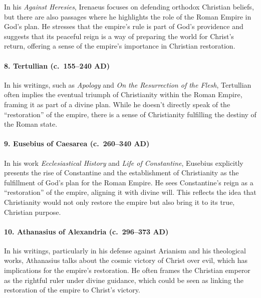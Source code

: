 In his \emph{Against Heresies}, Irenaeus focuses on defending orthodox Christian beliefs, but there are also passages where he highlights the role of the Roman Empire in God's plan.
He stresses that the empire's rule is part of God's providence and suggests that its peaceful reign is a way of preparing the world for Christ's return, offering a sense of the empire's importance in Christian restoration.

\paragraph{8.
Tertullian (c.~155--240 AD)}\label{par:tertullian-c.-155240-ad---in-his-writings-such-as-apology-and-on-the-resurrection-of-the-flesh-tertullian-often-implies-the-eventual-triumph-of-christianity-within-the-roman-empire-framing-it-as-part-of-a-divine-plan.-while-he-doesnt-directly-speak-of-the-restoration-of-the-empire-there-is-a-sense-of-christianity-fulfilling-the-destiny-of-the-roman-state.}

In his writings, such as \emph{Apology} and \emph{On the Resurrection of the Flesh}, Tertullian often implies the eventual triumph of Christianity within the Roman Empire, framing it as part of a divine plan.
While he doesn't directly speak of the ``restoration'' of the empire, there is a sense of Christianity fulfilling the destiny of the Roman state.

\paragraph{9.
Eusebius of Caesarea (c.~260--340 AD)}\label{par:eusebius-of-caesarea-c.-260340-ad}

In his work \emph{Ecclesiastical History} and \emph{Life of Constantine}, Eusebius explicitly presents the rise of Constantine and the establishment of Christianity as the fulfillment of God's plan for the Roman Empire.
He sees Constantine's reign as a ``restoration'' of the empire, aligning it with divine will.
This reflects the idea that Christianity would not only restore the empire but also bring it to its true, Christian purpose.

\paragraph{10.
Athanasius of Alexandria (c.~296--373 AD)}\label{par:athanasius-of-alexandria-c.-296373-ad}

In his writings, particularly in his defense against Arianism and his theological works, Athanasius talks about the cosmic victory of Christ over evil, which has implications for the empire's restoration.
He often frames the Christian emperor as the rightful ruler under divine guidance, which could be seen as linking the restoration of the empire to Christ's victory.

